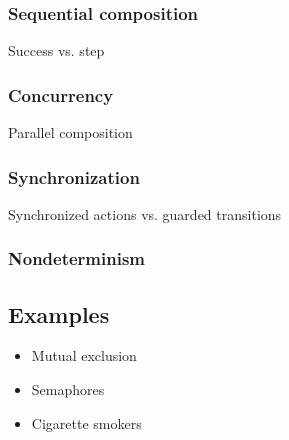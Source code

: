 \subsubsection*{Sequential composition}
Success vs. step

\subsubsection*{Concurrency}
Parallel composition

\subsubsection*{Synchronization}
Synchronized actions vs. guarded transitions

\subsubsection*{Nondeterminism}


\subsection{Examples}

\begin{itemize}
\item Mutual exclusion
\item Semaphores
\item Cigarette smokers
\end{itemize}
